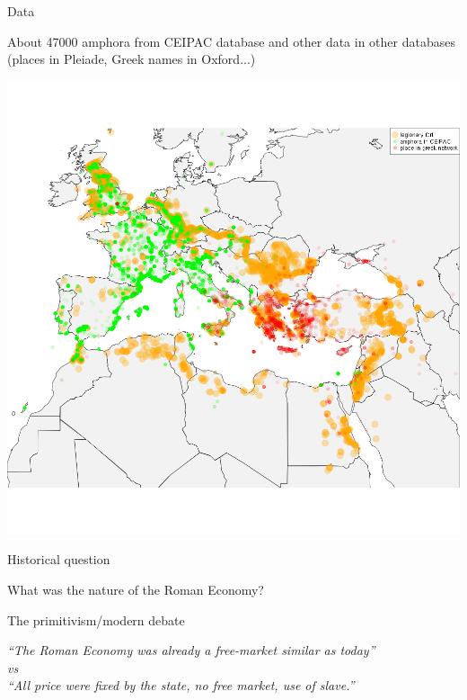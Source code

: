 \documentclass[8pt, handout=show,notes=show]{beamer}
\begin{document}
\begin{frame}{Data}

	About 47000 amphora from CEIPAC database and other data in other databases (places in Pleiade, Greek names in Oxford...)

	\begin{center}
		\includegraphics[width=.9\textwidth]{images/fortGreekPlaceAndAmphora.png}
	\end{center}
	
\end{frame}

\begin{frame}{Historical question}
	\begin{center}
		\Huge
		What was the nature of the Roman Economy?\\
	\end{center}
	\vfill
	\begin{block}
		{The primitivism/modern debate}
		\begin{center}
		    \em
		    ``The Roman Economy was already a free-market similar as today'' \\
		    \emph{vs}\\
		    ``All price were fixed by the state, no free market, use of slave.''
		\end{center}
	\end{block}
\end{frame}
\end{document}

